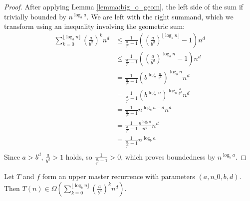 \begin{proof}
    \leanok
    After applying Lemma \ref{lemma:big_o_geom}, the left side of the sum if 
    trivially bounded by $n^{\log_b{a}}$. We are left with the right summand, 
    which we transform using an inequality involving the geometric sum:
    \begin{align*}
        \sum_{k=0}^{\lfloor \log_b{n} \rfloor} (\frac{a}{b^d})^k n^d
            &\leq \frac{1}{\frac{a}{b^d} - 1}
                    ((\frac{a}{b^d})^{\lfloor \log_b{n} \rfloor} - 1) n^d \\
            &\leq \frac{1}{\frac{a}{b^d} - 1}
                    ((\frac{a}{b^d})^{\log_b{n}} - 1) n^d \\
            &= \frac{1}{\frac{a}{b^d} - 1}
                    (b^{\log_b{\frac{a}{b^d}}})^{\log_b{n}} n^d \\
            &= \frac{1}{\frac{a}{b^d} - 1}
                    (b^{\log_b{n}})^{\log_b{\frac{a}{b^d}}} n^d \\
            &= \frac{1}{\frac{a}{b^d} - 1}
                    n^{\log_b{a} - d} n^d \\
            &= \frac{1}{\frac{a}{b^d} - 1}
                    \frac{n^{\log_b{a}}}{n^d} n^d \\
            &= \frac{1}{\frac{a}{b^d} - 1}
                    n^{\log_b{a}} \\
    \end{align*}
    Since $a > b^d$, $\frac{a}{b^d} > 1$ holds, so 
    $\frac{1}{\frac{a}{b^d} - 1} > 0$, which proves boundedness by 
    $n^{\log_b{a}}$.
\end{proof}


\begin{lemma}
    \label{lemma:big_omega_geom}
    \leanok
    Let $T$ and $f$ form an upper master recurrence with parameters 
    $(a, n\_0, b, d)$. Then $T(n) \in 
    \Omega(\sum_{k=0}^{\lfloor \log_b{n} \rfloor} (\frac{a}{b^d})^k n^d)$.
\end{lemma}

